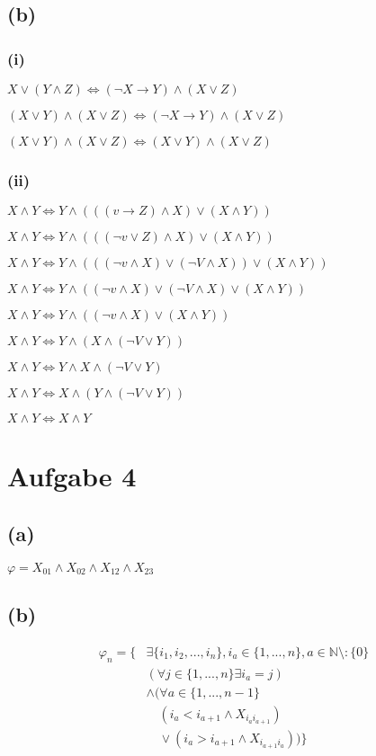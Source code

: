 \documentclass[11pt, a4paper]{article}
\renewcommand{\v}{\vee}
\newcommand{\n}{\wedge}
\begin{document}
\subsection*{(b)}
\subsubsection*{(i)}
$X \v (Y \n Z) \Leftrightarrow (\neg X \rightarrow Y)  \n (X \v Z)$

$(X \v Y) \n (X \v Z) \Leftrightarrow (\neg X \rightarrow Y) \n (X \v Z)$

$(X \v Y) \n (X \v Z) \Leftrightarrow (X \v Y) \n (X \v Z)$


\subsubsection*{(ii)}
$X \n Y \Leftrightarrow Y \n (((v \rightarrow Z) \n X) \v (X \n Y))$

$X \n Y \Leftrightarrow Y \n (((\neg v \v Z) \n X) \v (X \n Y))$

$X \n Y \Leftrightarrow Y \n (((\neg v \n X) \v (\neg V \n X)) \v (X \n Y))$

$X \n Y \Leftrightarrow Y \n ((\neg v \n X) \v (\neg V \n X) \v (X \n Y))$

$X \n Y \Leftrightarrow Y \n ((\neg v \n X) \v (X \n Y))$

$X \n Y \Leftrightarrow Y \n (X \n (\neg V \v Y))$

$X \n Y \Leftrightarrow Y \n X \n (\neg V \v Y)$

$X \n Y \Leftrightarrow X \n (Y \n (\neg V \v Y))$

$X \n Y \Leftrightarrow X \n Y$



\section*{Aufgabe 4}
\subsection*{(a)}
$\varphi = X_{01} \n X_{02} \n X_{12} \n X_{23}$

\subsection*{(b)}
\begin{align*}
    \varphi_n = \{&\exists \{i_1, i_2, ..., i_n\}, i_a \in \{1,...,n\}, a \in \mathbb{N}\setminus:\{0\}\\
    &(\forall j \in \{1,...,n\} \exists i_a = j) \\
    &\wedge (\forall a \in \{1,...,n-1\}\\
    & \quad (i_a < i_{a+1} \wedge X_{i_a i_{a+1}}) \\
    & \quad \vee(i_a > i_{a+1} \wedge X_{i_{a+1} i_a})) \}
\end{align*}
\end{document}
